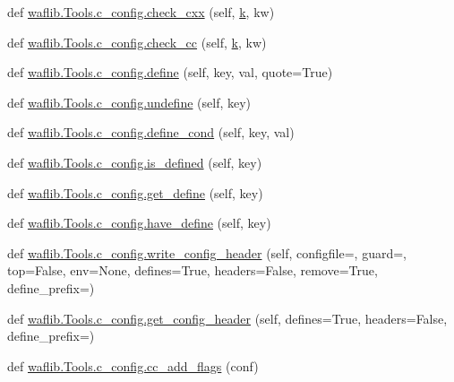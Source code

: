 \begin{DoxyCompactItemize}
\item 
def \hyperlink{namespacewaflib_1_1_tools_1_1c__config_a56e98ff4881c9fc86bdcfd0075e21967}{waflib.\+Tools.\+c\+\_\+config.\+check\+\_\+cxx} (self, \hyperlink{rfft2d_test_m_l_8m_adc468c70fb574ebd07287b38d0d0676d}{k}, kw)
\item 
def \hyperlink{namespacewaflib_1_1_tools_1_1c__config_aafa88569174a7bd6959eb079e45f9e5f}{waflib.\+Tools.\+c\+\_\+config.\+check\+\_\+cc} (self, \hyperlink{rfft2d_test_m_l_8m_adc468c70fb574ebd07287b38d0d0676d}{k}, kw)
\item 
def \hyperlink{namespacewaflib_1_1_tools_1_1c__config_aefc8712a0a3e7664272e76d085178811}{waflib.\+Tools.\+c\+\_\+config.\+define} (self, key, val, quote=True)
\item 
def \hyperlink{namespacewaflib_1_1_tools_1_1c__config_aeb8ffd395ba266ee2d8c980363c24a88}{waflib.\+Tools.\+c\+\_\+config.\+undefine} (self, key)
\item 
def \hyperlink{namespacewaflib_1_1_tools_1_1c__config_a636c9eacb867877684f412620a6b6b6a}{waflib.\+Tools.\+c\+\_\+config.\+define\+\_\+cond} (self, key, val)
\item 
def \hyperlink{namespacewaflib_1_1_tools_1_1c__config_a1478f0bc62d743d26996a86b25d14a74}{waflib.\+Tools.\+c\+\_\+config.\+is\+\_\+defined} (self, key)
\item 
def \hyperlink{namespacewaflib_1_1_tools_1_1c__config_a1f04496a9a6d169183ad82bb7b6df607}{waflib.\+Tools.\+c\+\_\+config.\+get\+\_\+define} (self, key)
\item 
def \hyperlink{namespacewaflib_1_1_tools_1_1c__config_a10f2fd410b28bac19d8a1cf226150bd2}{waflib.\+Tools.\+c\+\_\+config.\+have\+\_\+define} (self, key)
\item 
def \hyperlink{namespacewaflib_1_1_tools_1_1c__config_a431d2b1c6dccecd7d62c51a6348434bc}{waflib.\+Tools.\+c\+\_\+config.\+write\+\_\+config\+\_\+header} (self, configfile=\textquotesingle{}\textquotesingle{}, guard=\textquotesingle{}\textquotesingle{}, top=False, env=None, defines=True, headers=False, remove=True, define\+\_\+prefix=\textquotesingle{}\textquotesingle{})
\item 
def \hyperlink{namespacewaflib_1_1_tools_1_1c__config_a0c69508d77befbcea1727b1a135fc83a}{waflib.\+Tools.\+c\+\_\+config.\+get\+\_\+config\+\_\+header} (self, defines=True, headers=False, define\+\_\+prefix=\textquotesingle{}\textquotesingle{})
\item 
def \hyperlink{namespacewaflib_1_1_tools_1_1c__config_a60f244c4a4f5fc5f5c97a608ef15a4f9}{waflib.\+Tools.\+c\+\_\+config.\+cc\+\_\+add\+\_\+flags} (conf)

\end{DoxyCompactItemize}
